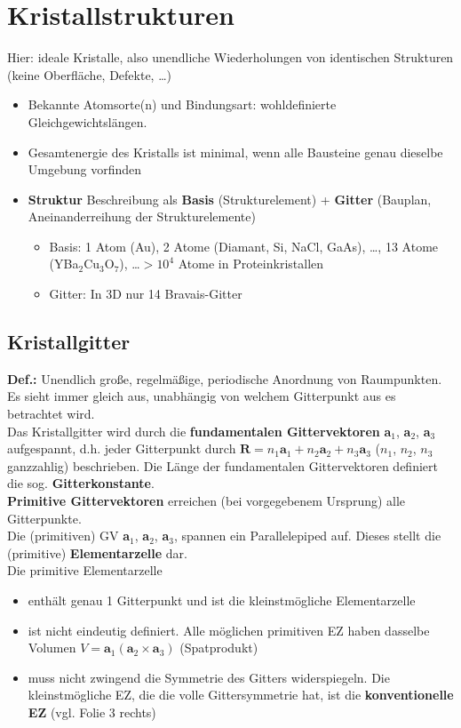 \section{Kristallstrukturen} \label{kap:2}
Hier: ideale Kristalle, also unendliche Wiederholungen von identischen Strukturen (keine Oberfläche, Defekte, \dots)
\begin{itemize}
    \item Bekannte Atomsorte(n) und Bindungsart: wohldefinierte Gleichgewichtslängen.
    \item Gesamtenergie des Kristalls ist minimal, wenn alle Bausteine genau dieselbe Umgebung vorfinden
    \item \textbf{Struktur} Beschreibung als \textbf{Basis} (Strukturelement) + \textbf{Gitter} (Bauplan, Aneinanderreihung der Strukturelemente)
          \begin{itemize}
              \item Basis: 1 Atom (Au), 2 Atome (Diamant, Si, NaCl, GaAs), \dots, 13 Atome (YBa$_2$Cu$_3$O$_7$), \dots $>10^4$ Atome in Proteinkristallen
              \item Gitter: In 3D nur 14 Bravais-Gitter
          \end{itemize}
\end{itemize}

\subsection{Kristallgitter} \label{kap:2_1}
\textbf{Def.:} Unendlich große, regelmäßige, periodische Anordnung von Raumpunkten. Es sieht immer gleich aus, unabhängig von welchem Gitterpunkt aus es betrachtet wird.\\
Das Kristallgitter wird durch die \textbf{fundamentalen Gittervektoren} \textbf{a$_1$}, \textbf{a$_2$}, \textbf{a$_3$} aufgespannt, d.h. jeder Gitterpunkt durch $\textbf{R} = n_1 \textbf{a}_1 + n_2 \textbf{a}_2 +n_3 \textbf{a}_3$ ($n_1$, $n_2$, $n_3$ ganzzahlig) beschrieben. Die Länge der fundamentalen Gittervektoren definiert die sog. \textbf{Gitterkonstante}.\\
\textbf{Primitive Gittervektoren} erreichen (bei vorgegebenem Ursprung) alle Gitterpunkte.\\
Die (primitiven) GV \textbf{a$_1$}, \textbf{a$_2$}, \textbf{a$_3$}, spannen ein Parallelepiped auf. Dieses stellt die (primitive) \textbf{Elementarzelle} dar.\\
Die primitive Elementarzelle\\
\begin{itemize}
    \item enthält genau 1 Gitterpunkt und ist die kleinstmögliche Elementarzelle
    \item ist nicht eindeutig definiert. Alle möglichen primitiven EZ haben dasselbe Volumen $V = \textbf{a}_1 (\textbf{a}_2 \times \textbf{a}_3)$ (Spatprodukt)
    \item muss nicht zwingend die Symmetrie des Gitters widerspiegeln. Die kleinstmögliche EZ, die die volle Gittersymmetrie hat, ist die \textbf{konventionelle EZ} (vgl. Folie 3 rechts)
\end{itemize}
